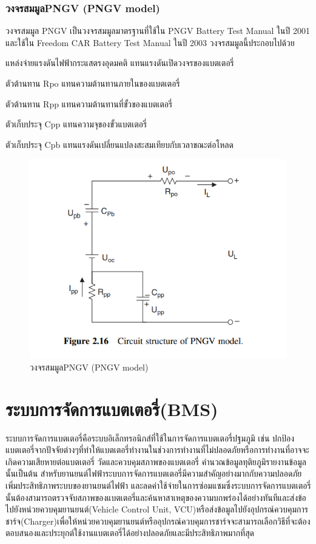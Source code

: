 \subsubsection*{วงจรสมมูลPNGV (PNGV model)}
วงจรสมมูล PNGV เป็นวงจรสมมูลมาตรฐานที่ใช้ใน PNGV Battery Test Manual ในปี 2001 และใช้ใน Freedom CAR Battery Test Manual
 ในปี 2003 วงจรสมมูลนี้ประกอบไปด้วย
\begin{itemize}
	{\item 	แหล่งจ่ายแรงดันไฟฟ้ากระแสตรงอุดมคติ แทนแรงดันเปิดวงจรของแบตเตอรี่}
	{\item 	ตัวต้านทาน Rpo แทนความต้านทานภายในของแบตเตอรี่}
	{\item 	ตัวต้านทาน Rpp แทนความต้านทานที่ขั้วของแบตเตอรี่}
	{\item 	ตัวเก็บประจุ Cpp แทนความจุของขั้วแบตเตอรี่}
	{\item 	ตัวเก็บประจุ Cpb แทนแรงดันเปลี่ยนแปลงสะสมเทียบกับเวลาขณะต่อโหลด}
\end{itemize}
\begin{center}
	\begin{figure}[!h]
		\includegraphics[width=0.6\linewidth]{Chapters/img/PNGV_model.png}
			\centering
			\captionsetup{justification=centering,margin=2cm}
			\caption{วงจรสมมูลPNGV (PNGV model)}
	\end{figure}
\end{center}
\section{ระบบการจัดการแบตเตอรี่(BMS)}
ระบบการจัดการแบตเตอรี่คือระบบอิเล็กทรอนิกส์ที่ใช้ในการจัดการแบตเตอรี่ปฐมภูมิ เช่น ปกป้องแบตเตอรี่จากปัจจัยต่างๆที่ทำให้แบตเตอรี่ทำงานในช่วงการทำงานที่ไม่ปลอดภัยหรือการทำงานที่อาจจะเกิดความเสียหายต่อแบตเตอรี่ 
วัดและควบคุมสภาพของแบตเตอรี่ คำนวณข้อมูลทุติยภูมิรายงานข้อมูลนั้นเป็นต้น
สำหรับยานยนต์ไฟฟ้าระบบการจัดการแบตเตอรี่มีความสำคัญอย่างมากกับความปลอดภัย เพิ่มประสิทธิภาพระบบของยานยนต์ไฟฟ้า และลดค่าใช้จ่ายในการซ่อมแซมซึ่งระบบการจัดการแบตเตอรี่นั้นต้องสามารถตรวจจับสภาพของแบตเตอรี่และค้นหาสาเหตุของความบกพร่องได้อย่างทันทีและส่งข้อไปยังหน่วยควบคุมยานยนต์(Vehicle Control Unit, VCU)หรือส่งข้อมูลไปยังอุปกรณ์ควบคุมการชาร์จ(Charger)เพื่อให้หน่วยควบคุมยานยนต์หรืออุปกรณ์ควบคุมการชาร์จจะสามารถเลือกวิธีที่จะต้องตอบสนองและประยุกต์ใช้งานแบตเตอรี่ได้อย่างปลอดภัยและมีประสิทธิภาพมากที่สุด\newline
